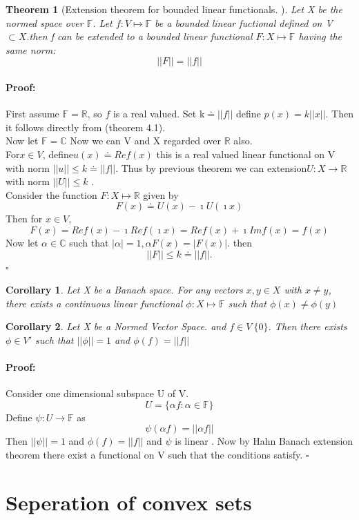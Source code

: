 \documentclass{article}
\newenvironment{proof}{\paragraph{Proof:}}{\hfill$\square$}
\newtheorem{theorem}{Theorem}[section]
\newtheorem{corollary}{Corollary}[theorem]
\begin{document}
\begin{theorem}[Extension theorem for bounded linear functionals. ]
    Let X be the normed space over $ \mathbb{F} $. Let $f:V \mapsto \mathbb{F} $ be a bounded linear fuctional defined on V$\subset X$.then f can be extended to a bounded linear functional $F: X\mapsto \mathbb{F}  $ having the same norm:$$||F ||= ||f||$$ 
\end{theorem}
\begin{proof}
    First assume $\mathbb{F} =\mathbb{R} $, so $f$ is a real valued. Set k$\doteq ||f||$ define $p(x)=k||x||$. Then it follows directly from (theorem 4.1). 
    \\Now let $\mathbb{F} =\mathbb{C} $ Now we can V and X regarded over $\mathbb{R} $ also.
    \\
    For$x \in V$, define$u(x)\doteq Re f(x)$ this is a real valued linear functional on V with norm $||u||\leq k\doteq ||f||$. Thus by previous theorem we can extension$U:X\rightarrow \mathbb{R} $ with norm $||U||\leq k$ . 
    \\ Consider the function $F:X \mapsto \mathbb{R} $ given by$$F(x)\doteq U(x)-\imath U(\imath x)$$
    Then for $x \in V$, $$F(x)=Re f(x) - \imath Re f(\imath x)=Re f(x) + \imath Im f(x) = f(x) $$
    Now let $\alpha \in \mathbb{C} $ such that $|\alpha|=1, \alpha F(x)= |F(x)|.$ then $$||F||\leq k\doteq ||f||. $$  
\end{proof}
\begin{corollary}
Let X be a Banach space. For any vectors $x,y \in X$ with $x\not=y$, there exists a continuous linear functional $\phi: X\mapsto \mathbb{F} $ such that $\phi(x) \not= \phi(y)$
\end{corollary}
\begin{corollary}
    Let X be a Normed Vector Space. and $f \in V\ \{0\}$. Then there exists $\phi \in V'$ such that $||\phi||=1 $ and $\phi(f)=||f||$  
\end{corollary}
\begin{proof}
    Consider one dimensional subspace U of V. $$U = \{ \alpha f : \alpha \in \mathbb{F} \}$$ Define $\psi:U \to \mathbb{F}  $ as $$\psi(\alpha f)=||\alpha f|| $$Then $||\psi ||= 1 $ and $\phi(f)=||f||$ and $\psi $ is linear . Now by Hahn Banach extension theorem there exist a functional on V such that the conditions satisfy. 
\end{proof}
\section{Seperation of convex sets}
\end{document}
